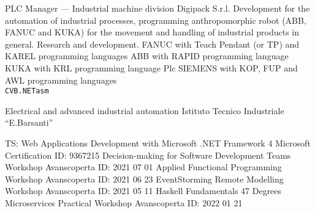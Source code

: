\documentclass[9pt]{developercv}
\begin{document}
\begin{entrylist}
		{PLC Manager --- Industrial machine division}
		{Digipack S.r.l.}
		{Development for the automation of industrial processes, programming anthropomorphic robot (ABB, FANUC and KUKA) for the movement and handling of industrial products in general. Research and development. FANUC with Teach Pendant (or TP) and KAREL programming languages ABB with RAPID programming language KUKA with KRL programming language Plc SIEMENS with KOP, FUP and AWL programming languages \\
	   \texttt{C}\slashsep\texttt{VB.NET}\slashsep\texttt{asm}}

\end{entrylist}



\begin{entrylist}
		{Electrical and advanced industrial automation}
		{Istituto Tecnico Industriale “E.Barsanti”}
		{}
\end{entrylist}



\begin{entrylist}
		{TS\@: Web Applications Development with Microsoft \@.NET Framework 4}
		{Microsoft Certification}
		{ID\@: 9367215}
		{Decision-making for Software Development Teams Workshop}
		{Avanscoperta}
		{ID\@: 2021 07 01}
		{Applied Functional Programming Workshop}
		{Avanscoperta}
		{ID\@: 2021 06 23}
		{EventStorming Remote Modelling Workshop}
		{Avanscoperta}
		{ID\@: 2021 05 11}
		{Haskell Fundamentals }
		{47 Degrees}
		{}
		{Microservices Practical Workshop}
		{Avanscoperta}
		{ID\@: 2022 01 21}
\end{entrylist}
\end{document}
